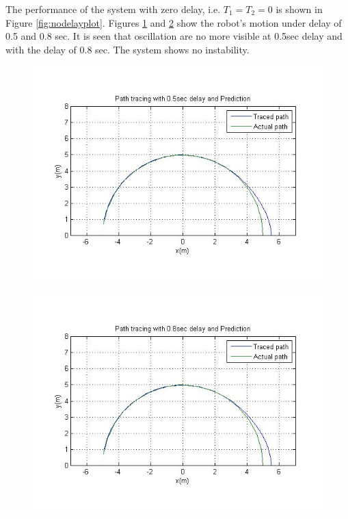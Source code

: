  The  performance of the system with zero delay, i.e. $T_1=T_2=0$ is shown in Figure \ref{fig:nodelayplot}. Figures \ref{fig:PreDelay500plot} and \ref{fig:PreDelay800plot} show the   robot's motion under delay of 0.5 and 0.8 sec.  It is seen that oscillation are no more visible at 0.5sec delay and with the delay of  0.8 sec. The system shows no instability. 
 \begin{figure}[h]
 	\includegraphics[width=\linewidth,keepaspectratio]{Chapter7/fig/withPrediction05dely}
 	\label{fig:PreDelay500plot} 
 \end{figure} 
 \begin{figure}[h]
 	\includegraphics[width=\linewidth,keepaspectratio]{Chapter7/fig/withPrediction08delay}
 	\label{fig:PreDelay800plot} 
 \end{figure}
  
